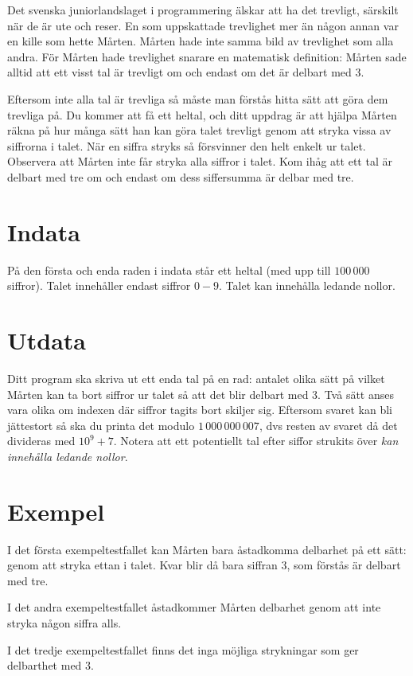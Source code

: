 Det svenska juniorlandslaget i programmering älskar att ha det trevligt, särskilt när de är ute och reser. En som uppskattade trevlighet mer än någon annan var en kille som hette Mårten. Mårten hade inte samma bild av trevlighet som alla andra. För Mårten hade trevlighet snarare en matematisk definition: Mårten sade alltid att ett visst tal är trevligt om och endast om det är delbart med 3.

Eftersom inte alla tal är trevliga så måste man förstås hitta sätt att göra dem trevliga på. Du kommer att få ett heltal, och ditt uppdrag är att hjälpa Mårten räkna på hur många sätt han kan göra talet trevligt genom att stryka vissa av siffrorna i talet. När en siffra stryks så försvinner den helt enkelt ur talet. Observera att Mårten inte får stryka alla siffror i talet. Kom ihåg att ett tal är delbart med tre om och endast om dess siffersumma är delbar med tre.

\section*{Indata}
På den första och enda raden i indata står ett heltal (med upp till $100\,000$ siffror). Talet innehåller endast siffror $0-9$. Talet kan innehålla ledande nollor.

\section*{Utdata}
Ditt program ska skriva ut ett enda tal på en rad: antalet olika sätt på vilket Mårten kan ta bort siffror ur talet så att det blir delbart med 3. Två sätt anses vara olika om indexen där siffror tagits bort skiljer sig. Eftersom svaret kan bli jättestort så ska du printa det modulo $1\,000\,000\,007$, dvs resten av svaret då det divideras med $10^9 + 7$. Notera att ett potentiellt tal efter siffor strukits över \emph{kan innehålla ledande nollor}.

\section*{Exempel}
I det första exempeltestfallet kan Mårten bara åstadkomma delbarhet på ett sätt: genom att stryka ettan i talet. Kvar blir då bara siffran 3, som förstås är delbart med tre.

I det andra exempeltestfallet åstadkommer Mårten delbarhet genom att inte stryka någon siffra alls.

I det tredje exempeltestfallet finns det inga möjliga strykningar som ger delbarthet med 3.


